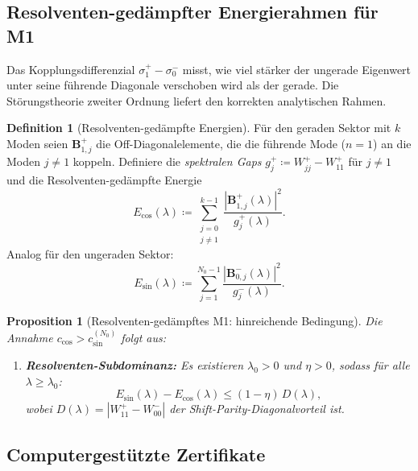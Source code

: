 \documentclass[12pt,a4paper]{article}
\newtheorem{proposition}[theorem]{Proposition}
\theoremstyle{definition}
\newtheorem{definition}[theorem]{Definition}
\theoremstyle{remark}
\begin{document}
\subsection{Resolventen-gedämpfter Energierahmen für M1}
\label{sec:resolvent-M1}

Das Kopplungsdifferenzial $\sigma_1^+ - \sigma_0^-$ misst, wie viel stärker der ungerade Eigenwert unter seine führende Diagonale verschoben wird als der gerade. Die Störungstheorie zweiter Ordnung liefert den korrekten analytischen Rahmen.

\begin{definition}[Resolventen-gedämpfte Energien]
\label{def:resolvent-energies}
Für den geraden Sektor mit $k$ Moden seien $\mathbf{B}^+_{1,j}$ die Off-Diagonalelemente, die die führende Mode ($n=1$) an die Moden $j \neq 1$ koppeln. Definiere die \emph{spektralen Gaps} $g_j^+ \coloneqq W_{jj}^+ - W_{11}^+$ für $j \neq 1$ und die Resolventen-gedämpfte Energie
\[
  E_{\cos}(\lambda) \coloneqq \sum_{\substack{j=0 \\ j \neq 1}}^{k-1} \frac{|\mathbf{B}^+_{1,j}(\lambda)|^2}{g_j^+(\lambda)}.
\]
Analog für den ungeraden Sektor:
\[
  E_{\sin}(\lambda) \coloneqq \sum_{j=1}^{N_0-1} \frac{|\mathbf{B}^-_{0,j}(\lambda)|^2}{g_j^-(\lambda)}.
\]
\end{definition}

\begin{proposition}[Resolventen-gedämpftes M1: hinreichende Bedingung]
\label{prop:resolvent-M1}
Die Annahme $c_{\cos} > c_{\sin}^{(N_0)}$ folgt aus:
\begin{enumerate}[label=\textup{(M1$''$)}]
  \item\label{M1pp} \textbf{Resolventen-Subdominanz:} Es existieren $\lambda_0 > 0$ und $\eta > 0$, sodass für alle $\lambda \geq \lambda_0$:
  \begin{equation}
  \label{eq:resolvent-subdominance}
    E_{\sin}(\lambda) - E_{\cos}(\lambda) \leq (1 - \eta)\,D(\lambda),
  \end{equation}
  wobei $D(\lambda) = |W_{11}^+ - W_{00}^-|$ der Shift-Parity-Diagonalvorteil ist.
\end{enumerate}
\end{proposition}

\subsection{Computergestützte Zertifikate}
\label{sec:certificates}
\end{document}
